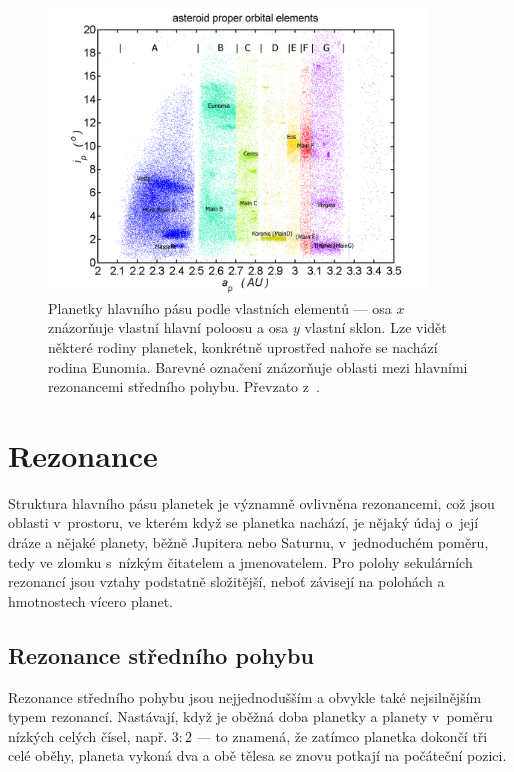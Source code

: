 \documentclass[A4paper, 12pt, oneside]{book}
\begin{document}
\begin{figure}
	\centering
	\includegraphics[width=0.9\textwidth]{obr/mainbelt.png}
	\caption{Planetky hlavního pásu podle vlastních elementů --- osa $x$ znázorňuje vlastní hlavní poloosu a osa $y$ vlastní sklon. Lze vidět některé rodiny planetek, konkrétně uprostřed nahoře se nachází rodina Eunomia. Barevné označení znázorňuje oblasti mezi hlavními rezonancemi středního pohybu. Převzato z~\cite{wiki:belt}.} \label{fig:belt}
\end{figure}

\pagebreak
\section{Rezonance}
Struktura hlavního pásu planetek je významně ovlivněna rezonancemi, což jsou oblasti v~prostoru, ve kterém když se planetka nachází, je nějaký údaj o~její dráze a nějaké planety, běžně Jupitera nebo Saturnu, v~jednoduchém poměru, tedy ve zlomku s~nízkým čitatelem a jmenovatelem. Pro polohy sekulárních rezonancí jsou vztahy podstatně složitější, neboť závisejí na polohách a hmotnostech vícero planet.
\subsection{Rezonance středního pohybu} \label{sec:meanmotion}

Rezonance středního pohybu jsou nejjednodušším a obvykle také nejsilnějším typem rezonancí. Nastávají, když je oběžná doba planetky a planety v~poměru nízkých celých čísel, např. $3:2$ --- to znamená, že zatímco planetka dokončí tři celé oběhy, planeta vykoná dva a obě tělesa se znovu potkají na počáteční pozici. 
\end{document}
